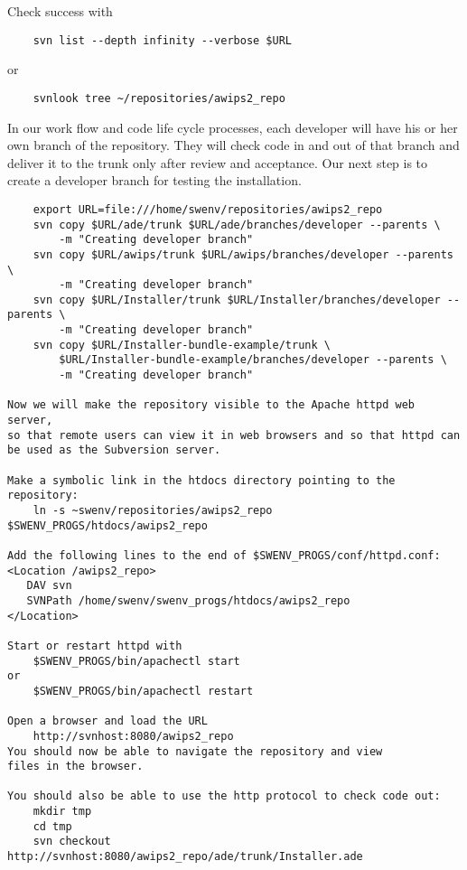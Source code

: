 Check success with
\begin{verbatim}
    svn list --depth infinity --verbose $URL
\end{verbatim}
or
\begin{verbatim}
    svnlook tree ~/repositories/awips2_repo 
\end{verbatim}

In our work flow and code life cycle processes, each developer will have
his or her own branch of the repository.  They will check code in and
out of that branch and deliver it to the trunk only after review and
acceptance.  Our next step is to create a developer branch for testing
the installation.


\begin{verbatim}
    export URL=file:///home/swenv/repositories/awips2_repo
    svn copy $URL/ade/trunk $URL/ade/branches/developer --parents \
        -m "Creating developer branch"
    svn copy $URL/awips/trunk $URL/awips/branches/developer --parents \
        -m "Creating developer branch"
    svn copy $URL/Installer/trunk $URL/Installer/branches/developer --parents \
        -m "Creating developer branch"
    svn copy $URL/Installer-bundle-example/trunk \
        $URL/Installer-bundle-example/branches/developer --parents \
        -m "Creating developer branch"

Now we will make the repository visible to the Apache httpd web server,
so that remote users can view it in web browsers and so that httpd can
be used as the Subversion server.

Make a symbolic link in the htdocs directory pointing to the repository:
    ln -s ~swenv/repositories/awips2_repo $SWENV_PROGS/htdocs/awips2_repo

Add the following lines to the end of $SWENV_PROGS/conf/httpd.conf:
<Location /awips2_repo>
   DAV svn
   SVNPath /home/swenv/swenv_progs/htdocs/awips2_repo
</Location>

Start or restart httpd with
    $SWENV_PROGS/bin/apachectl start
or 
    $SWENV_PROGS/bin/apachectl restart

Open a browser and load the URL
    http://svnhost:8080/awips2_repo
You should now be able to navigate the repository and view 
files in the browser.

You should also be able to use the http protocol to check code out:
    mkdir tmp
    cd tmp
    svn checkout http://svnhost:8080/awips2_repo/ade/trunk/Installer.ade


\end{verbatim}

